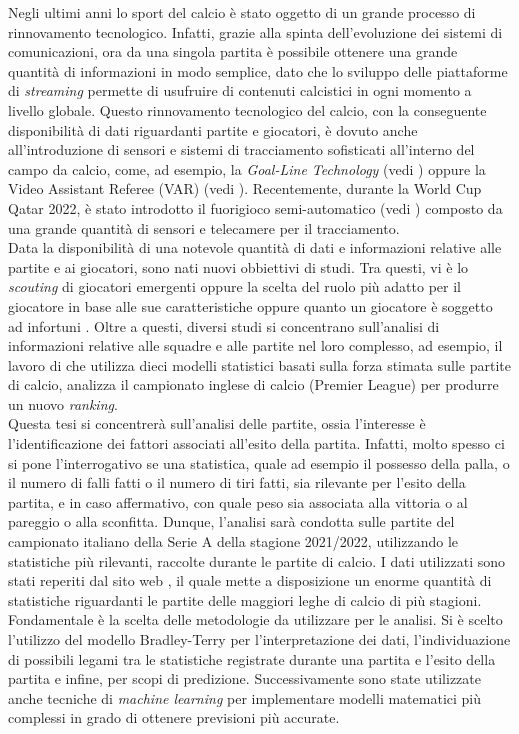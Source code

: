 Negli ultimi anni lo sport del calcio è stato oggetto di un grande processo di rinnovamento tecnologico. Infatti, grazie alla spinta dell'evoluzione dei sistemi di comunicazioni, ora da una singola partita è possibile ottenere una grande quantità di informazioni in modo semplice, dato che lo sviluppo delle piattaforme di \emph{streaming} permette di usufruire di contenuti calcistici in ogni momento a livello globale. Questo rinnovamento tecnologico del calcio, con la conseguente disponibilità di dati riguardanti partite e giocatori, è dovuto anche all'introduzione di sensori e sistemi di tracciamento sofisticati all'interno del campo da calcio, come, ad esempio, la \emph{Goal-Line Technology} (vedi \textit{\cite{glt}}) oppure la Video Assistant Referee (VAR) (vedi \textit{\cite{var}}). Recentemente, durante la World Cup Qatar 2022, è stato introdotto il fuorigioco semi-automatico (vedi \textit{\cite{offside}}) composto da una grande quantità di sensori e telecamere per il tracciamento.\\
Data la disponibilità di una notevole quantità di dati e informazioni relative alle partite e ai giocatori, sono nati nuovi obbiettivi di studi. Tra questi, vi è lo \textit{scouting} di giocatori emergenti \autocite{vilela2018towards} oppure la scelta del ruolo più adatto per il giocatore in base alle sue caratteristiche \autocite{razali2017predicting} oppure quanto un giocatore è soggetto ad infortuni \autocite{theron2020use}. Oltre a questi, diversi studi si concentrano sull'analisi di informazioni relative alle squadre e alle partite nel loro complesso, ad esempio, il lavoro di \autocite{ley2019ranking} che utilizza dieci modelli statistici basati sulla forza stimata sulle partite di calcio, analizza il campionato inglese di calcio (Premier League) per produrre un nuovo \emph{ranking}.\\
Questa tesi si concentrerà sull'analisi delle partite, ossia l'interesse è l'identificazione dei fattori associati all'esito della partita. Infatti, molto spesso ci si pone l'interrogativo se una statistica, quale ad esempio il possesso della palla, o il numero di falli fatti o il numero di tiri fatti, sia rilevante per l'esito della partita, e in caso affermativo, con quale peso sia associata alla vittoria o al pareggio o alla sconfitta. Dunque, l'analisi sarà condotta sulle partite del campionato italiano della Serie A della stagione 2021/2022, utilizzando le statistiche più rilevanti, raccolte durante le partite di calcio. I dati utilizzati sono stati reperiti dal sito web \textit{\cite{fbref}}, il quale mette a disposizione un enorme quantità di statistiche riguardanti le partite delle maggiori leghe di calcio di più stagioni.\\
Fondamentale è la scelta delle metodologie da utilizzare per le analisi. Si è scelto l'utilizzo del modello Bradley-Terry \autocite{bradley1952rank} per l'interpretazione dei dati, l'individuazione di possibili legami tra le statistiche registrate durante una partita e l'esito della partita e infine, per scopi di predizione. Successivamente sono state utilizzate anche tecniche di \emph{machine learning} per implementare modelli matematici più complessi in grado di ottenere previsioni più accurate.
